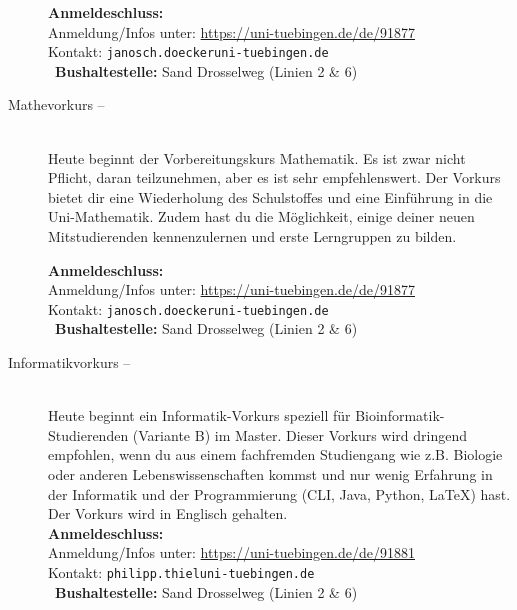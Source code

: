 \begin{description}
			\textbf{Anmeldeschluss:} \matheanmeldung\YEAR\\
			Anmeldung/Infos unter:  \url{https://uni-tuebingen.de/de/91877}\\
			Kontakt: \texttt{janosch.doecker\At uni-tuebingen.de}\\
			\ifsommersemester
			~\textbf{Bushaltestelle:} Sand Drosselweg (Linien 2 \& 6) 
			\fi
		\fi
	\fi
\fi

\ifbachelor
	\item[Mathevorkurs -- \mathedatum~\YEAR]~\\
	Heute beginnt der Vorbereitungskurs Mathematik. Es ist zwar nicht Pflicht, daran teilzunehmen, aber es ist sehr empfehlenswert.
	Der Vorkurs bietet dir eine Wiederholung des Schulstoffes und eine Einführung in die Uni-Mathematik. Zudem hast du die Möglichkeit, einige deiner neuen Mitstudierenden kennenzulernen und erste Lerngruppen zu bilden.
	
	\textbf{Anmeldeschluss:} \matheanmeldung\YEAR\\
	Anmeldung/Infos unter:  \url{https://uni-tuebingen.de/de/91877}\\
	Kontakt: \texttt{janosch.doecker\At uni-tuebingen.de}\\
	\ifsommersemester
	~\textbf{Bushaltestelle:} Sand Drosselweg (Linien 2 \& 6) 
	\fi
\fi

\ifmaster
    \ifbinfo
        \item[Informatikvorkurs -- \bioinfoDatum~\YEAR]\ \\
            Heute beginnt ein Informatik-Vorkurs speziell für Bioinformatik-Studierenden (Variante B) im Master. Dieser Vorkurs wird dringend empfohlen, wenn du aus einem fachfremden Studiengang wie z.B. Biologie oder anderen Lebenswissenschaften kommst und nur wenig Erfahrung in der Informatik und der Programmierung (CLI, Java, Python, \LaTeX) hast. Der Vorkurs wird in Englisch gehalten. \\
            \textbf{Anmeldeschluss:} \bioinfoAnmeldung\YEAR\\
            Anmeldung/Infos unter: \url{https://uni-tuebingen.de/de/91881}\\
            Kontakt: \texttt{philipp.thiel\At uni-tuebingen.de}\\
        ~\textbf{Bushaltestelle:} Sand Drosselweg (Linien 2 \& 6)
    \fi
\fi



\end{description}
